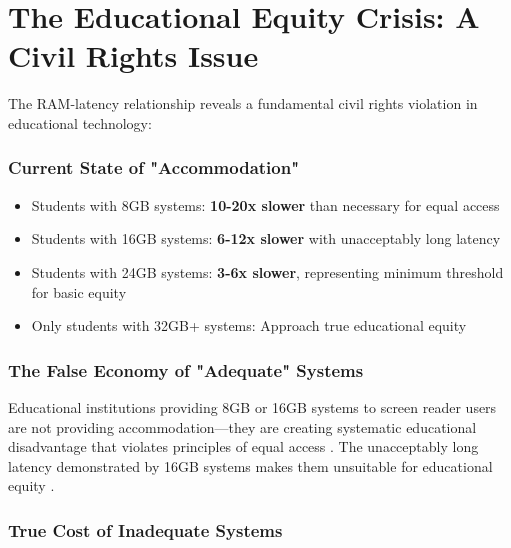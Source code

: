 \normalsize



\hypertarget{the-educational-equity-crisis}{}\section{The Educational Equity Crisis: A Civil Rights Issue}\label{the-educational-equity-crisis}

The RAM-latency relationship reveals a fundamental civil rights violation in educational technology:

\subsubsection{Current State of "Accommodation"}

\begin{itemize}
	\item Students with 8GB systems: \textbf{10-20x slower} than necessary for equal access \supercite{EducationalEquityReport2024}
	\item Students with 16GB systems: \textbf{6-12x slower} with unacceptably long latency \supercite{EducationalEquityReport2024}
	\item Students with 24GB systems: \textbf{3-6x slower}, representing minimum threshold for basic equity \supercite{EducationalEquityReport2024}
	\item Only students with 32GB+ systems: Approach true educational equity \supercite{EducationalEquityReport2024}
\end{itemize}

\subsubsection{The False Economy of "Adequate" Systems}
Educational institutions providing 8GB or 16GB systems to screen reader users are not providing accommodation—they are creating systematic educational disadvantage that violates principles of equal access \supercite{ADA1990, Section504RehabAct}. The unacceptably long latency demonstrated by 16GB systems makes them unsuitable for educational equity \supercite{EducationalEquityReport2024}.

\subsubsection{True Cost of Inadequate Systems}

